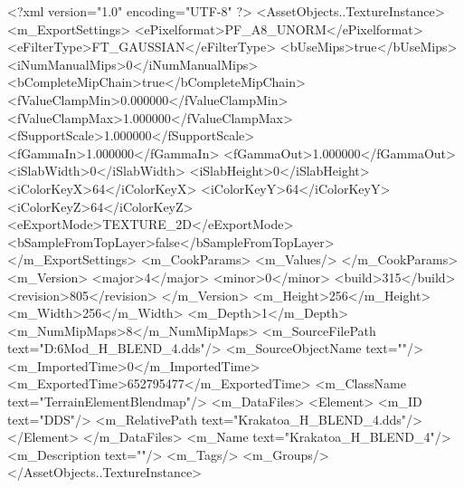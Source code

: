 <?xml version="1.0" encoding="UTF-8" ?>
<AssetObjects..TextureInstance>
	<m_ExportSettings>
		<ePixelformat>PF_A8_UNORM</ePixelformat>
		<eFilterType>FT_GAUSSIAN</eFilterType>
		<bUseMips>true</bUseMips>
		<iNumManualMips>0</iNumManualMips>
		<bCompleteMipChain>true</bCompleteMipChain>
		<fValueClampMin>0.000000</fValueClampMin>
		<fValueClampMax>1.000000</fValueClampMax>
		<fSupportScale>1.000000</fSupportScale>
		<fGammaIn>1.000000</fGammaIn>
		<fGammaOut>1.000000</fGammaOut>
		<iSlabWidth>0</iSlabWidth>
		<iSlabHeight>0</iSlabHeight>
		<iColorKeyX>64</iColorKeyX>
		<iColorKeyY>64</iColorKeyY>
		<iColorKeyZ>64</iColorKeyZ>
		<eExportMode>TEXTURE_2D</eExportMode>
		<bSampleFromTopLayer>false</bSampleFromTopLayer>
	</m_ExportSettings>
	<m_CookParams>
		<m_Values/>
	</m_CookParams>
	<m_Version>
		<major>4</major>
		<minor>0</minor>
		<build>315</build>
		<revision>805</revision>
	</m_Version>
	<m_Height>256</m_Height>
	<m_Width>256</m_Width>
	<m_Depth>1</m_Depth>
	<m_NumMipMaps>8</m_NumMipMaps>
	<m_SourceFilePath text="D:\Civ6Mod\Terrain\NW\Krakatoa\Krakatoa_H_BLEND_4.dds"/>
	<m_SourceObjectName text=""/>
	<m_ImportedTime>0</m_ImportedTime>
	<m_ExportedTime>652795477</m_ExportedTime>
	<m_ClassName text="TerrainElementBlendmap"/>
	<m_DataFiles>
		<Element>
			<m_ID text="DDS"/>
			<m_RelativePath text="Krakatoa_H_BLEND_4.dds"/>
		</Element>
	</m_DataFiles>
	<m_Name text="Krakatoa_H_BLEND_4"/>
	<m_Description text=""/>
	<m_Tags/>
	<m_Groups/>
</AssetObjects..TextureInstance>


